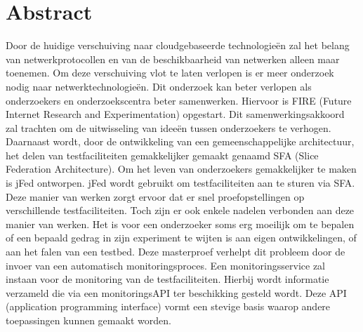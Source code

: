\newpage
\chapter*{Abstract}
\npar
Door de huidige verschuiving naar cloudgebaseerde technologie\"en zal het belang 
van netwerkprotocollen en van de beschikbaarheid van netwerken alleen maar toenemen.
Om deze verschuiving vlot te laten verlopen is er meer onderzoek nodig naar netwerktechnologie\"en. Dit onderzoek kan beter verlopen als onderzoekers en onderzoekscentra beter samenwerken. Hiervoor is FIRE (Future Internet Research and Experimentation) opgestart. Dit samenwerkingsakkoord zal trachten om de uitwisseling van ideeën tussen onderzoekers te verhogen.
\npar
Daarnaast wordt, door de ontwikkeling van een gemeenschappelijke architectuur,  het delen van testfaciliteiten gemakkelijker gemaakt genaamd SFA (Slice Federation Architecture). Om het leven van onderzoekers gemakkelijker te maken is jFed ontworpen. jFed wordt gebruikt om testfaciliteiten aan te sturen via SFA. Deze manier van werken zorgt ervoor dat er snel proefopstellingen op verschillende testfaciliteiten. Toch zijn er ook enkele nadelen verbonden aan deze manier van werken. Het is voor een onderzoeker soms erg moeilijk om te bepalen of een bepaald gedrag in zijn experiment te wijten is aan eigen ontwikkelingen, of aan het falen van een testbed.
\npar
Deze masterproef verhelpt dit probleem door de invoer van een automatisch monitoringsproces. Een monitoringsservice zal instaan voor de monitoring van de testfaciliteiten. Hierbij wordt informatie verzameld die via een monitoringsAPI ter beschikking gesteld wordt. Deze API (application programming interface) vormt een stevige basis waarop andere toepassingen kunnen gemaakt worden.
